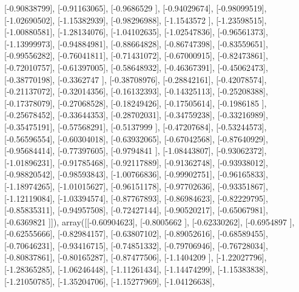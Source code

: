 \documentclass{article}
\begin{document}
       [-0.90838799],
       [-0.91163065],
       [-0.9686529 ],
       [-0.94029674],
       [-0.98099519],
       [-1.02690502],
       [-1.15382939],
       [-0.98296988],
       [-1.1543572 ],
       [-1.23598515],
       [-1.00880581],
       [-1.28134076],
       [-1.04102635],
       [-1.02547836],
       [-0.96561373],
       [-1.13999973],
       [-0.94884981],
       [-0.88664828],
       [-0.86747398],
       [-0.83559651],
       [-0.99556282],
       [-0.76041811],
       [-0.71431072],
       [-0.67000915],
       [-0.82473861],
       [-0.72010757],
       [-0.61397005],
       [-0.58648932],
       [-0.46367391],
       [-0.45062473],
       [-0.38770198],
       [-0.3362747 ],
       [-0.38708976],
       [-0.28842161],
       [-0.42078574],
       [-0.21137072],
       [-0.32014356],
       [-0.16132393],
       [-0.14325113],
       [-0.25208388],
       [-0.17378079],
       [-0.27068528],
       [-0.18249426],
       [-0.17505614],
       [-0.1986185 ],
       [-0.25678452],
       [-0.33644353],
       [-0.28702031],
       [-0.34759238],
       [-0.33216989],
       [-0.35475191],
       [-0.57568291],
       [-0.5137999 ],
       [-0.47207684],
       [-0.53244573],
       [-0.56596554],
       [-0.60304018],
       [-0.63932065],
       [-0.67042568],
       [-0.87640929],
       [-0.95684414],
       [-0.77397605],
       [-0.9794841 ],
       [-1.08443807],
       [-0.93062372],
       [-1.01896231],
       [-0.91785468],
       [-0.92117889],
       [-0.91362748],
       [-0.93938012],
       [-0.98820542],
       [-0.98593843],
       [-1.00766836],
       [-0.99902751],
       [-0.96165833],
       [-1.18974265],
       [-1.01015627],
       [-0.96151178],
       [-0.97702636],
       [-0.93351867],
       [-1.12119084],
       [-1.03394574],
       [-0.87767893],
       [-0.86984623],
       [-0.82229795],
       [-0.85835311],
       [-0.94957508],
       [-0.72427144],
       [-0.90520217],
       [-0.65067981],
       [-0.6369821 ]]), array([[-0.60904623],
       [-0.8005662 ],
       [-0.62330262],
       [-0.6954897 ],
       [-0.62555666],
       [-0.82984157],
       [-0.63807102],
       [-0.89052616],
       [-0.68589455],
       [-0.70646231],
       [-0.93416715],
       [-0.74851332],
       [-0.79706946],
       [-0.76728034],
       [-0.80837861],
       [-0.80165287],
       [-0.87477506],
       [-1.1404209 ],
       [-1.22027796],
       [-1.28365285],
       [-1.06246448],
       [-1.11261434],
       [-1.14474299],
       [-1.15383838],
       [-1.21050785],
       [-1.35204706],
       [-1.15277969],
       [-1.04126638],
\end{document}

